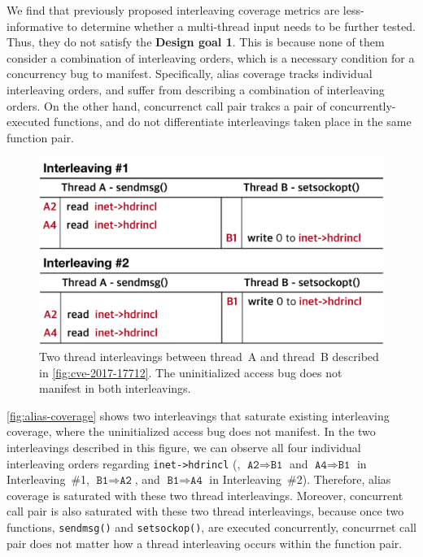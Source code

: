 %
We find that previously proposed interleaving coverage metrics are
less-informative to determine whether a multi-thread input needs to be
further tested. Thus, they do not satisfy the \textbf{Design goal 1}.
%
This is because none of them consider a combination of interleaving
orders, which is a necessary condition for a concurrency bug to
manifest.
%
Specifically, alias coverage tracks individual interleaving orders,
and suffer from describing a combination of interleaving orders.
%
On the other hand, concurrenct call pair trakcs a pair of
concurrently-executed functions, and do not differentiate
interleavings taken place in the same function pair.




\begin{figure}[t]
  \centering
  \includegraphics[width=0.90\linewidth]{fig/alias-coverage.pdf}
  \caption{Two thread interleavings between thread~A and thread~B
    described in \autoref{fig:cve-2017-17712}. The uninitialized
    access bug does not manifest in both interleavings.}
  \label{fig:alias-coverage}
\end{figure}


\autoref{fig:alias-coverage} shows two interleavings that saturate
existing interleaving coverage, where the uninitialized access bug
does not manifest.
%
In the two interleavings described in this figure, we can observe all
four individual interleaving orders regarding \texttt{inet->hdrincl}
(\ie, $\texttt{A2} \Rightarrow \texttt{B1}$ and
$\texttt{A4} \Rightarrow \texttt{B1}$ in Interleaving~\#1,
$\texttt{B1} \Rightarrow \texttt{A2}$, and
$\texttt{B1} \Rightarrow \texttt{A4}$ in Interleaving~\#2).
%
Therefore, alias coverage is saturated with these two thread
interleavings.
%
Moreover, concurrent call pair is also saturated with these two thread
interleavings, because once two functions, \texttt{sendmsg()} and
\texttt{setsockop()}, are executed concurrently, concurrnet call pair
does not matter how a thread interleaving occurs within the function
pair.

